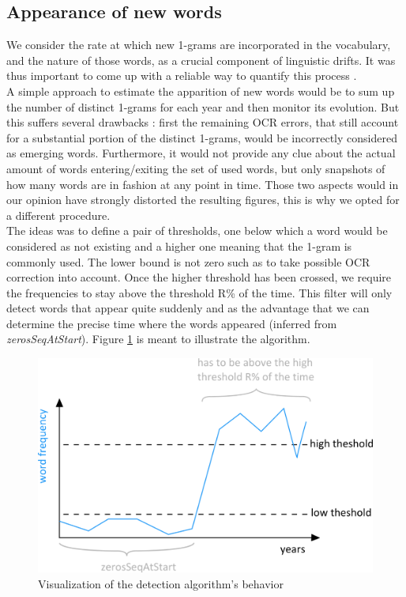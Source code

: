 \subsection{Appearance of new words}

We consider the rate at which new 1-grams are incorporated in the vocabulary, and the nature of those words,  as a crucial component of linguistic drifts. It was thus important to come up with a reliable way to quantify this process .\\

A simple approach to estimate the apparition of new words would be to sum up the number of distinct 1-grams for each year and then monitor its evolution. But this suffers several drawbacks : first the remaining OCR errors, that still account for a substantial portion of the distinct 1-grams,  would be incorrectly considered as emerging words.  Furthermore, it would not provide any clue about the actual amount of words entering/exiting the set of used words, but only snapshots of how many words are in fashion at any point in time. Those two aspects would in our opinion have strongly distorted the resulting figures, this is why we opted for a different procedure.\\

The ideas was to define a pair of thresholds, one below which a word would be considered as not existing and a higher one meaning that the 1-gram is commonly used. The lower bound is not zero such as to take possible OCR correction into account. Once the higher threshold has been crossed, we require the frequencies to stay above the threshold R\% of the time.  This filter will only detect words that appear quite suddenly and as the advantage that we can determine the precise time where the words appeared (inferred from \textit{zerosSeqAtStart}). Figure \ref{algoschema} is meant to illustrate the algorithm.\\

\begin{figure}[h!]
        \includegraphics[scale=0.7]{Pictures/statistics/appearing-words/algo-schema.png}
        \caption{Visualization of the detection algorithm's behavior}
        \label{algoschema}
	\centering
\end{figure}

